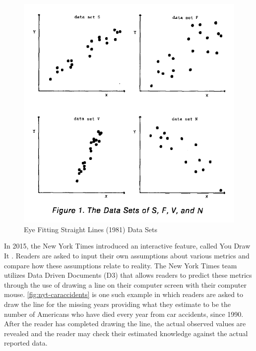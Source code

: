 \documentclass[12pt]{article}
\begin{document}
\begin{figure}[tbp]

{\centering \includegraphics[width=0.7\linewidth,]{images/eyefitting-straight-lines-plots} 

}

\caption{Eye Fitting Straight Lines (1981) Data Sets}\label{fig:mosteller-eyefitting-plot}
\end{figure}

In 2015, the New York Times introduced an interactive feature, called
You Draw It
\citep{aisch_cox_quealy_2015, buchanan_park_pearce_2017, katz_2017}.
Readers are asked to input their own assumptions about various metrics
and compare how these assumptions relate to reality. The New York Times
team utilizes Data Driven Documents (D3) that allows readers to predict
these metrics through the use of drawing a line on their computer screen
with their computer mouse. \cref{fig:nyt-caraccidents} \citep{katz_2017}
is one such example in which readers are asked to draw the line for the
missing years providing what they estimate to be the number of Americans
who have died every year from car accidents, since 1990. After the
reader has completed drawing the line, the actual observed values are
revealed and the reader may check their estimated knowledge against the
actual reported data.
\end{document}
